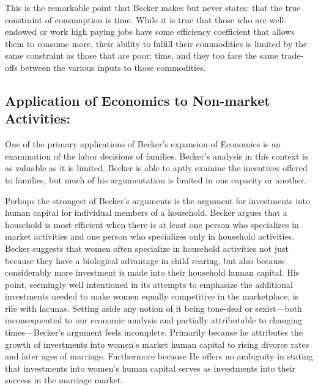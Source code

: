 \documentclass{article}
\begin{document}
This is the remarkable point that Becker makes but never states: that the true constraint of consumption is time. While it is true that those who are well-endowed or work high paying jobs have some efficiency coefficient that allows them to consume more, their ability to fulfill their commodities is limited by the same constraint as those that are poor: time, and they too face the same trade-offs between the various inputs to those commodities. 

\subsection{Application of Economics to Non-market Activities:}

One of the primary applications of Becker's expansion of Economics is an examination of the labor decisions of families. Becker's analysis in this context is as valuable as it is limited. Becker is able to aptly examine the incentives offered to families, but much of his argumentation is limited in one capacity or another. 

Perhaps the strongest of Becker's arguments is the argument for investments into human capital for individual members of a household. Becker argues that a household is most efficient when there is at least one person who specializes in market activities and one person who specializes only in household activities. Becker suggests that women often specialize in household activities not just because they have a biological advantage in child rearing, but also because considerably more investment is made into their household human capital. His point, seemingly well intentioned in its attempts to emphasize the additional investments needed to make women equally competitive in the marketplace, is rife with lacunas. Setting aside any notion of it being tone-deaf or sexist—both inconsequential to our economic analysis and partially attributable to changing times—Becker's argument feels incomplete. Primarily because he attributes the growth of investments into women's market human capital to rising divorce rates and later ages of marriage. Furthermore because He offers no ambiguity in stating that investments into women's human capital serves as investments into their success in the marriage market. 
\end{document}
